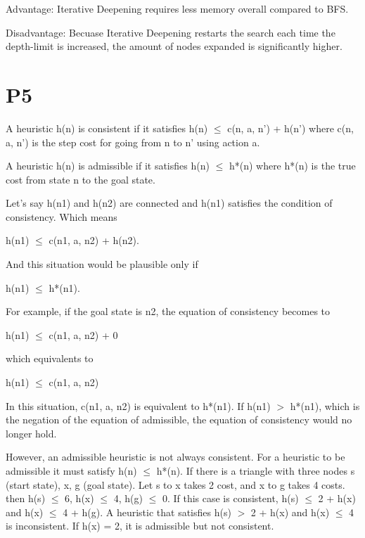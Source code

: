 \documentclass{article}
\begin{document}
\hspace{5mm}

Advantage: Iterative Deepening requires less memory overall compared to BFS.

Disadvantage: Becuase Iterative Deepening restarts the search each time the depth-limit is increased, the amount of nodes expanded is significantly higher.

\section*{P5}

\hspace{5mm}

A heuristic h(n) is consistent if it satisfies h(n) $\le$ c(n, a, n’) + h(n’) where c(n, a, n’) is the step cost for going from n to n’ using action a.

A heuristic h(n) is admissible if it satisfies h(n) $\le$ h*(n) where h*(n) is the true cost from state n to the goal state.

Let’s say h(n1) and h(n2) are connected and h(n1) satisfies the condition of consistency. Which means
\begin{center}

	h(n1) $\le$ c(n1, a, n2) + h(n2). 

\end{center}
And this situation would be plausible only if 
\begin{center}

	h(n1) $\le$ h*(n1).
	
\end{center}
For example, if the goal state is n2, the equation of consistency becomes to 
\begin{center}

	h(n1) $\le$ c(n1, a, n2) + 0
	
	which equivalents to 
	
	h(n1) $\le$ c(n1, a, n2)

\end{center}
In this situation, c(n1, a, n2) is equivalent to h*(n1). If h(n1) $>$ h*(n1), which is the negation of the equation of admissible, the equation of consistency would no longer hold.


However, an admissible heuristic is not always consistent.
For a heuristic to be admissible it must satisfy h(n) $\le$ h*(n). If there is a triangle with three nodes s (start state), x, g (goal state). Let s to x takes 2 cost, and x to g takes 4 costs. then h(s) $\le$ 6, h(x) $\le$ 4, h(g) $\le$ 0. If this case is consistent, h(s) $\le$ 2 + h(x) and h(x) $\le$ 4 + h(g). A heuristic that satisfies h(s) $>$ 2 + h(x) and h(x) $\le$ 4 is inconsistent. If h(x) = 2, it is admissible but not consistent.
\end{document}
